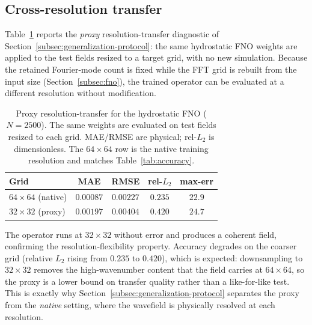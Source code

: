 \subsection{Cross-resolution transfer}
\label{subsec:res-crossres}

Table~\ref{tab:crossres} reports the \emph{proxy} resolution-transfer diagnostic of Section~\ref{subsec:generalization-protocol}: the same hydrostatic FNO weights are applied to the test fields resized to a target grid, with no new simulation. Because the retained Fourier-mode count is fixed while the FFT grid is rebuilt from the input size (Section~\ref{subsec:fno}), the trained operator can be evaluated at a different resolution without modification.

\begin{table}[!htbp]
\centering
\caption{Proxy resolution-transfer for the hydrostatic FNO ($N=2500$). The same weights are evaluated on test fields resized to each grid. MAE/RMSE are physical; rel-$L_2$ is dimensionless. The $64 \times 64$ row is the native training resolution and matches Table~\ref{tab:accuracy}.}
\label{tab:crossres}
\begin{tabular}{lcccc}
    \toprule
    Grid & MAE & RMSE & rel-$L_2$ & max-err \\
    \midrule
    $64\times64$ (native) & $0.00087$ & $0.00227$ & $0.235$ & $22.9$ \\
    $32\times32$ (proxy)  & $0.00197$ & $0.00404$ & $0.420$ & $24.7$ \\
    \bottomrule
\end{tabular}
\end{table}

The operator runs at $32 \times 32$ without error and produces a coherent field, confirming the resolution-flexibility property. Accuracy degrades on the coarser grid (relative $L_2$ rising from $0.235$ to $0.420$), which is expected: downsampling to $32 \times 32$ removes the high-wavenumber content that the field carries at $64 \times 64$, so the proxy is a lower bound on transfer quality rather than a like-for-like test. This is exactly why Section~\ref{subsec:generalization-protocol} separates the proxy from the \emph{native} setting, where the wavefield is physically resolved at each resolution.

